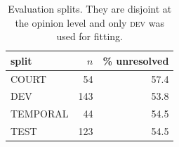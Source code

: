 \begin{table}[t]
\centering\small
\begin{tabular}{lrr}
\toprule
split & $n$ & \% unresolved \\
\midrule
COURT & 54 & 57.4 \\
DEV & 143 & 53.8 \\
TEMPORAL & 44 & 54.5 \\
TEST & 123 & 54.5 \\
\bottomrule
\end{tabular}
\caption{Evaluation splits. They are disjoint at the opinion level and only \textsc{dev} was used for fitting.}
\label{tab:splits}
\end{table}
